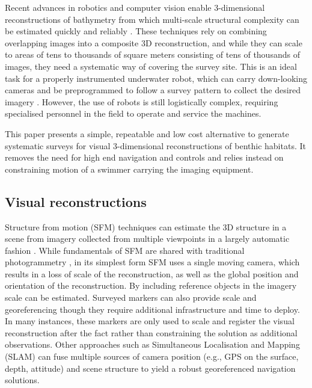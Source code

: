\newline

Recent advances in robotics and computer vision enable 3-dimensional reconstructions of bathymetry from which multi-scale structural complexity can be estimated quickly and reliably \cite{Friedman_2012}. These techniques rely on combining overlapping images into a composite 3D reconstruction, and while they can scale to areas of tens to thousands of square meters consisting of tens of thousands of images, they need a systematic way of covering the survey site. This is an ideal task for a properly instrumented underwater robot, which can carry down-looking cameras and be preprogrammed to follow a survey pattern to collect the desired imagery \cite{Williams_2012}. However, the use of robots is still logistically complex, requiring specialised personnel in the field to operate and service the machines. 

This paper presents a simple, repeatable and low cost alternative to generate systematic surveys for visual 3-dimensional reconstructions of benthic habitats. It removes the need for high end navigation and controls and relies instead on constraining motion of a swimmer carrying the imaging equipment. 

\subsection{Visual reconstructions} \label{sec:VisRec}

Structure from motion (SFM) techniques can estimate the 3D structure in a scene from imagery collected from multiple viewpoints in a largely automatic fashion \cite{Hartley_2004}. While fundamentals of SFM are shared with traditional photogrammetry \cite{Jones_1982}, in its simplest form SFM uses a single moving camera, which results in a loss of scale of the reconstruction, as well as the global position and orientation of the reconstruction. By including reference objects in the imagery scale can be estimated. Surveyed markers can also provide scale and georeferencing though they require additional infrastructure and time to deploy. In many instances, these markers are only used to scale and register the visual reconstruction after the fact rather than constraining the solution as additional observations.
Other approaches such as Simultaneous Localisation and Mapping (SLAM) \cite{Thrun_2008} can fuse multiple sources of camera position (e.g., GPS on the surface, depth, attitude) and scene structure to yield a robust georeferenced navigation solutions.

